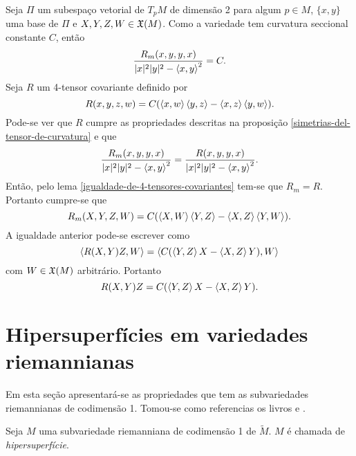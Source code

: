 \begin{demonstracao}
	Seja $\Pi$ um subespaço vetorial de $T_p M$ de dimensão 2 para algum $p \in M$, $\{x,y\}$ uma base de $\Pi$ e $X,Y,Z,W \in \mathfrak{X}(M)$. Como a variedade tem curvatura seccional constante $C$, então
	\begin{equation*}
	\frac{R_m(x,y,y,x)}{|x|^2 |y|^2 - \left\langle x,y \right\rangle^2} = C.
	\end{equation*}
	Seja $R$ um 4-tensor covariante definido por
	\begin{equation*}
	R(x,y,z,w) = C (\left\langle x,w \right\rangle \left\langle y,z \right\rangle - \left\langle x,z \right\rangle \left\langle y,w \right\rangle).
	\end{equation*}
	Pode-se ver que $R$ cumpre as propriedades descritas na proposição \ref{simetrias-del-tensor-de-curvatura} e que
	\begin{equation*}
	\frac{R_m(x,y,y,x)}{|x|^2 |y|^2 - \left\langle x,y \right\rangle^2} = \frac{R(x,y,y,x)}{|x|^2 |y|^2 - \left\langle x,y \right\rangle^2}.
	\end{equation*}
	Então, pelo lema \ref{igualdade-de-4-tensores-covariantes} tem-se que $R_m = R$. Portanto cumpre-se que
	\begin{equation*}
	R_m(X,Y,Z,W) = C(\left\langle X,W \right\rangle \left\langle Y,Z \right\rangle - \left\langle X,Z \right\rangle \left\langle Y,W \right\rangle).
	\end{equation*}
	A igualdade anterior pode-se escrever como
	\begin{equation*}
	\left\langle R(X,Y)Z,W \right\rangle =  \left\langle C(\left\langle Y,Z \right\rangle X - \left\langle X,Z \right\rangle Y),W \right\rangle
	\end{equation*}
	com $W \in \mathfrak{X}(M)$ arbitrário. Portanto
	\begin{equation*}
	R(X,Y)Z =  C(\left\langle Y,Z \right\rangle X - \left\langle X,Z \right\rangle Y).
	\end{equation*}
\end{demonstracao}

\section{Hipersuperfícies em variedades riemannianas}

Em esta seção apresentará-se as propriedades que tem as subvariedades riemannianas de codimensão 1.
Tomou-se como referencias os livros \cite{Lee1997} e \cite{Gallot2004}.

\begin{definicao}
	Seja $M$ uma subvariedade riemanniana de codimensão 1 de $\tilde{M}$. $M$ é chamada de \emph{hipersuperfície}.
\end{definicao}

